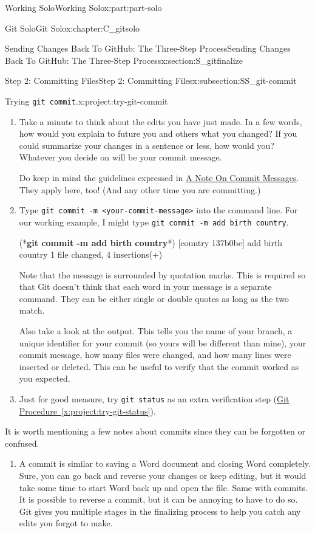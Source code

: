 \documentclass[oneside,10pt,]{book}
\newcommand{\xreffont}{\relax}
\newcommand{\mono}[1]{\texttt{#1}}
\newcommand{\consoleinput}[1]{\textbf{#1}}
\begin{document}
\begin{partptx}{Working Solo}{}{Working Solo}{}{}{x:part:part-solo}
\begin{chapterptx}{Git Solo}{}{Git Solo}{}{}{x:chapter:C_gitsolo}
\begin{sectionptx}{Sending Changes Back To GitHub: The Three-Step Process}{}{Sending Changes Back To GitHub: The Three-Step Process}{}{}{x:section:S_gitfinalize}
\begin{subsectionptx}{Step 2: Committing Files}{}{Step 2: Committing Files}{}{}{x:subsection:SS_git-commit}
\begin{project}{Trying \mono{git commit}.}{x:project:try-git-commit}
\begin{enumerate}[font=\bfseries,label=(\alph*),ref=\alph*]
\item{}Take a minute to think about the edits you have just made. In a few words, how would you explain to future you and others what you changed? If you could summarize your changes in a sentence or less, how would you? Whatever you decide on will be your commit message.%
\par
Do keep in mind the guidelines expressed in \hyperref[x:assemblage:commitmessages]{A Note On Commit Messages}. They apply here, too! (And any other time you are committing.)%
\item{}Type \mono{git commit -m \textquotedbl{}<your-commit-message>\textquotedbl{}} into the command line. For our working example, I might type \mono{git commit -m \textquotedbl{}add birth country\textquotedbl{}}.%
\begin{console}{0}{1}{0}
(*\consoleinput{git commit -m \textquotedbl{}add birth country\textquotedbl{}}*)
[country 137b0bc] add birth country
 1 file changed, 4 insertions(+)
\end{console}
Note that the message is surrounded by quotation marks. This is required so that Git doesn't think that each word in your message is a separate command. They can be either single or double quotes as long as the two match.%
\par
Also take a look at the output. This tells you the name of your branch, a unique identifier for your commit (so yours will be different than mine), your commit message, how many files were changed, and how many lines were inserted or deleted. This can be useful to verify that the commit worked as you expected.%
\item{}Just for good measure, try \mono{git status} as an extra verification step (\hyperref[x:project:try-git-status]{Git Procedure~{\xreffont\ref{x:project:try-git-status}}}).%
\end{enumerate}
\end{project}%
 It is worth mentioning a few notes about commits since they can be forgotten or confused.%
\begin{enumerate}
\item{}A commit is similar to saving a Word document and closing Word completely. Sure, you can go back and reverse your changes or keep editing, but it would take some time to start Word back up and open the file. Same with commits. It is possible to reverse a commit, but it can be annoying to have to do so. Git gives you multiple stages in the finalizing process to help you catch any edits you forgot to make.%

\end{enumerate}
\end{subsectionptx}
\end{sectionptx}
\end{chapterptx}
\end{partptx}
\end{document}
